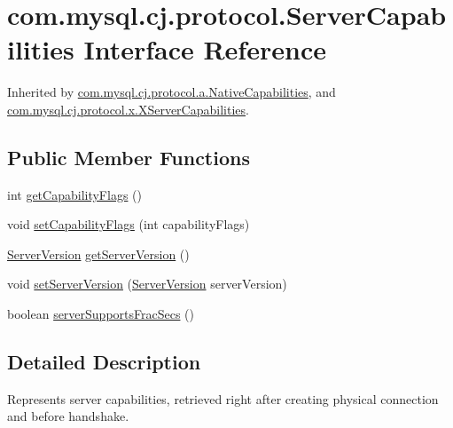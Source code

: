 \hypertarget{interfacecom_1_1mysql_1_1cj_1_1protocol_1_1_server_capabilities}{}\section{com.\+mysql.\+cj.\+protocol.\+Server\+Capabilities Interface Reference}
\label{interfacecom_1_1mysql_1_1cj_1_1protocol_1_1_server_capabilities}


Inherited by \mbox{\hyperlink{classcom_1_1mysql_1_1cj_1_1protocol_1_1a_1_1_native_capabilities}{com.\+mysql.\+cj.\+protocol.\+a.\+Native\+Capabilities}}, and \mbox{\hyperlink{classcom_1_1mysql_1_1cj_1_1protocol_1_1x_1_1_x_server_capabilities}{com.\+mysql.\+cj.\+protocol.\+x.\+X\+Server\+Capabilities}}.

\subsection*{Public Member Functions}
\begin{DoxyCompactItemize}
\item 
int \mbox{\hyperlink{interfacecom_1_1mysql_1_1cj_1_1protocol_1_1_server_capabilities_a9f0922d4351d008218162eaa73d37536}{get\+Capability\+Flags}} ()
\item 
void \mbox{\hyperlink{interfacecom_1_1mysql_1_1cj_1_1protocol_1_1_server_capabilities_ab5da8f1853ad82353d0446b785d98ee2}{set\+Capability\+Flags}} (int capability\+Flags)
\item 
\mbox{\hyperlink{classcom_1_1mysql_1_1cj_1_1_server_version}{Server\+Version}} \mbox{\hyperlink{interfacecom_1_1mysql_1_1cj_1_1protocol_1_1_server_capabilities_a08a31377b5af7f20476eaea763c05a15}{get\+Server\+Version}} ()
\item 
void \mbox{\hyperlink{interfacecom_1_1mysql_1_1cj_1_1protocol_1_1_server_capabilities_a4474ed857120dcbd9148d3b94e2962ac}{set\+Server\+Version}} (\mbox{\hyperlink{classcom_1_1mysql_1_1cj_1_1_server_version}{Server\+Version}} server\+Version)
\item 
boolean \mbox{\hyperlink{interfacecom_1_1mysql_1_1cj_1_1protocol_1_1_server_capabilities_aebc6a8a4326d4af70a1919bb99483524}{server\+Supports\+Frac\+Secs}} ()
\end{DoxyCompactItemize}


\subsection{Detailed Description}
Represents server capabilities, retrieved right after creating physical connection and before handshake. 

